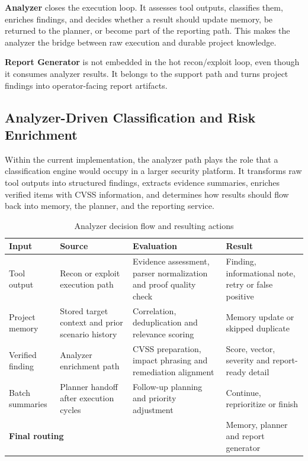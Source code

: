 \documentclass[12pt,a4paper]{report}
\begin{document}
\textbf{Analyzer} closes the execution loop. It assesses tool outputs, classifies
them, enriches findings, and decides whether a result should update memory, be
returned to the planner, or become part of the reporting path. This makes the
analyzer the bridge between raw execution and durable project knowledge.

\textbf{Report Generator} is not embedded in the hot recon/exploit loop, even though
it consumes analyzer results. It belongs to the support path and turns project
findings into operator-facing report artifacts.

\subsection{Analyzer-Driven Classification and Risk Enrichment}

Within the current implementation, the analyzer path plays the role that a
classification engine would occupy in a larger security platform. It transforms raw
tool outputs into structured findings, extracts evidence summaries, enriches verified
items with CVSS information, and determines how results should flow back into memory,
the planner, and the reporting service.

\begin{table}[H]
    \centering
    \caption{Analyzer decision flow and resulting actions}
    \label{tab:ssvc}
    \renewcommand{\arraystretch}{1.35}
    \begin{tabular}{|p{}|p{}|p{}|p{}|}
        \hline
        \textbf{Input} & \textbf{Source} & \textbf{Evaluation} & \textbf{Result} \\
        \hline
        Tool output & Recon or exploit execution path & Evidence assessment, parser normalization and proof quality check & Finding, informational note, retry or false positive \\
        \hline
        Project memory & Stored target context and prior scenario history & Correlation, deduplication and relevance scoring & Memory update or skipped duplicate \\
        \hline
        Verified finding & Analyzer enrichment path & CVSS preparation, impact phrasing and remediation alignment & Score, vector, severity and report-ready detail \\
        \hline
        Batch summaries & Planner handoff after execution cycles & Follow-up planning and priority adjustment & Continue, reprioritize or finish \\
        \hline
        \multicolumn{3}{|p{0.69\textwidth}|}{\textbf{Final routing}} & Memory, planner and report generator \\
        \hline
    \end{tabular}
\end{table}
\end{document}
